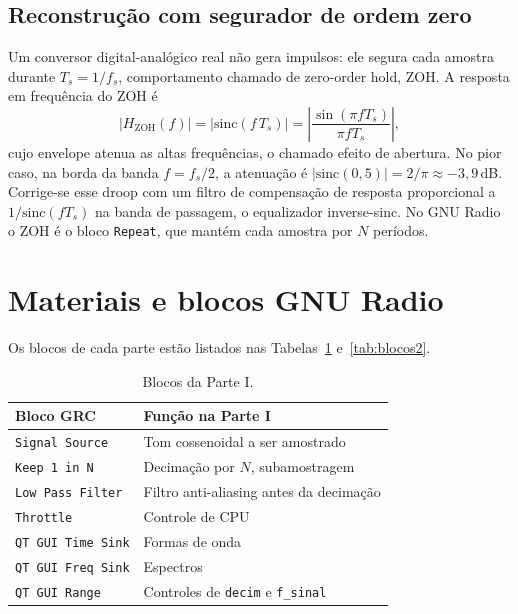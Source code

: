 \documentclass[11pt,a4paper]{article}
\begin{document}
\subsection*{Reconstrução com segurador de ordem zero}

Um conversor digital-analógico real não gera impulsos: ele segura cada
amostra durante $T_s = 1/f_s$, comportamento chamado de zero-order hold, ZOH.
A resposta em frequência do ZOH é
\begin{equation}
  |H_\text{ZOH}(f)| = \bigl|\text{sinc}(f\,T_s)\bigr|
  = \left|\frac{\sin(\pi f T_s)}{\pi f T_s}\right|,
  \label{eq:zoh}
\end{equation}
cujo envelope atenua as altas frequências, o chamado efeito de abertura. No
pior caso, na borda da banda $f = f_s/2$, a atenuação é
$|\text{sinc}(0{,}5)| = 2/\pi \approx -3{,}9$\,dB. Corrige-se esse droop com um
filtro de compensação de resposta proporcional a $1/\text{sinc}(f T_s)$ na
banda de passagem, o equalizador inverse-sinc. No GNU Radio o ZOH é o bloco
\texttt{Repeat}, que mantém cada amostra por $N$ períodos.

\section{Materiais e blocos GNU Radio}

Os blocos de cada parte estão listados nas Tabelas~\ref{tab:blocos1}
e~\ref{tab:blocos2}.

\begin{table}[H]
  \centering
  \begin{tabular}{l l}
    \toprule
    \textbf{Bloco GRC} & \textbf{Função na Parte I} \\
    \midrule
    \texttt{Signal Source}     & Tom cossenoidal a ser amostrado \\
    \texttt{Keep 1 in N}       & Decimação por $N$, subamostragem \\
    \texttt{Low Pass Filter}   & Filtro anti-aliasing antes da decimação \\
    \texttt{Throttle}          & Controle de CPU \\
    \texttt{QT GUI Time Sink}  & Formas de onda \\
    \texttt{QT GUI Freq Sink}  & Espectros \\
    \texttt{QT GUI Range}      & Controles de \texttt{decim} e \texttt{f\_sinal} \\
    \bottomrule
  \end{tabular}
  \caption{Blocos da Parte I.}
  \label{tab:blocos1}
\end{table}
\end{document}

